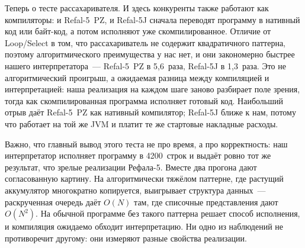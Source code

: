 Теперь о тесте рассахаривателя.
И здесь конкуренты также работают как компиляторы: и Refal-5~PZ,
и Refal-5J сначала переводят программу в нативный код или байт-код, а потом
исполняют уже скомпилированное. Отличие от Loop/Select в том, что
рассахариватель не содержит квадратичного паттерна, поэтому алгоритмического
преимущества у нас нет, и они закономерно быстрее нашего интерпретатора~---
Refal-5~PZ в 5,6~раза, Refal-5J в 1,3~раза. Это не алгоритмический проигрыш,
а ожидаемая разница между компиляцией и интерпретацией: наша реализация на
каждом шаге заново разбирает поле зрения, тогда как скомпилированная программа
исполняет готовый код. Наибольший отрыв даёт Refal-5~PZ как нативный
компилятор; Refal-5J ближе к нам, потому что работает на той же JVM и платит
те же стартовые накладные расходы.

Важно, что главный вывод этого теста не про время, а про корректность: наш
интерпретатор исполняет программу в 4200~строк и выдаёт ровно тот же результат,
что зрелые реализации Рефала-5. Вместе два прогона дают согласованную картину.
На алгоритмически тяжёлом паттерне, где растущий аккумулятор многократно
копируется, выигрывает структура данных~--- раскрученная очередь даёт $O(N)$
там, где списочные представления дают $O(N^2)$. На обычной программе без
такого паттерна решает способ исполнения, и компиляция ожидаемо обходит
интерпретацию. Ни одно из наблюдений не противоречит другому: они измеряют
разные свойства реализации.
